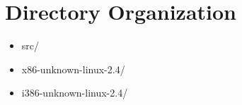 \section{Directory Organization}

\begin{itemize}
\item src/
\item x86-unknown-linux-2.4/
\item i386-unknown-linux-2.4/
\end{itemize}
